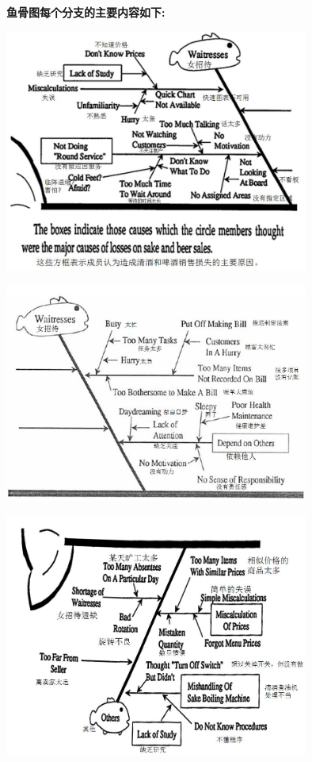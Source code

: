 \textbf{鱼骨图每个分支的主要内容如下:}


\includegraphics[width=10cm]{club121.jpg}


\includegraphics[width=10cm]{club131.jpg}


\includegraphics[width=10cm]{club141.jpg}

